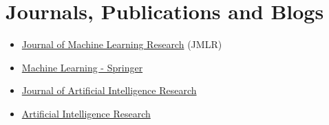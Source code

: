 \documentclass[a4, 10pt]{article}
\begin{document}
\section*{Journals, Publications and Blogs}
\begin{itemize}
	\item \href{http://www.jmlr.org/}{Journal of Machine Learning Research} (JMLR)
	\item \href{https://www.springer.com/computer/ai/journal/10994}{Machine Learning - Springer}
	\item \href{https://www.jair.org/index.php/jair}{Journal of Artificial Intelligence Research}
	\item \href{http://www.sciedupress.com/journal/index.php/air}{Artificial Intelligence Research}
\end{itemize}
\end{document}
